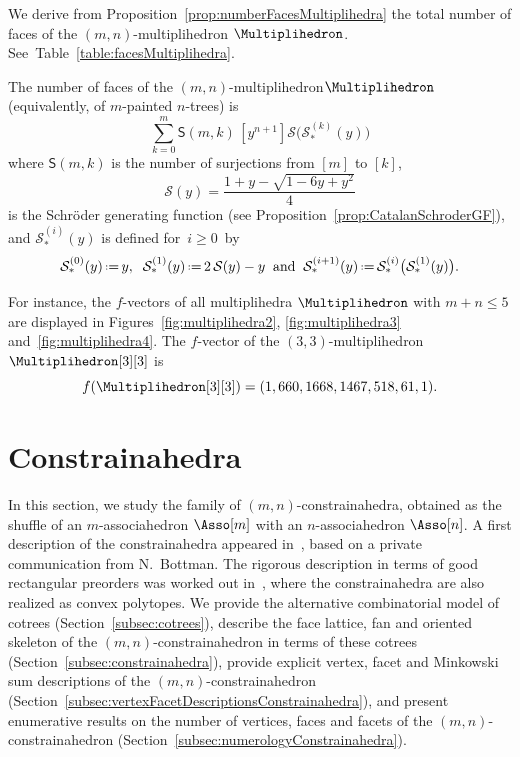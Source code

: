 \documentclass[AHL,Unicode,longabstracts,published]{cedram}
\newcommand{\eqdef}{\mbox{\,\raisebox{0.2ex}{\scriptsize\ensuremath{\mathrm:}}\ensuremath{=}\,}}
\newcommand{\surjections}[2]{\mathsf{S}(#1,#2)}
\newcommand{\SGF}{\mathcal{S}}
\newcommand{\tSGF}{\mathcal{S}_\ast}
\begin{document}
We derive from Proposition~\ref{prop:numberFacesMultiplihedra} the total number of faces of the $(m,n)$-multipli\-hedron $\Multiplihedron$. See~Table~\ref{table:facesMultiplihedra}.

\begin{prop}\label{prop:numberFacesMultiplihedra2}
The number of faces of the $(m,n)$-multiplihedron\linebreak ${\Multiplihedron}$ (equivalently, of $m$-painted $n$-trees) is
\[
\sum_{k = 0}^m \surjections{m}{k} \, \left[y^{n+1}\right] \SGF \big(\tSGF^{(k)}(y) \big)
\]
where $\surjections{m}{k}$ is the number of surjections from $[m]$ to $[k]$,
\[
\SGF(y) = \frac{1+y-\sqrt{1-6y+y^2}}{4}
\]
is the Schr\"oder generating function (see Proposition~\ref{prop:CatalanSchroderGF}), and $\tSGF^{(i)}(y)$ is defined for~$i \ge 0$~by
\[
\tSGF^{(0)}(y) \eqdef y,
\;\;
\tSGF^{(1)}(y) \eqdef 2 \, \SGF(y) - y
\;\;\text{and}\;\;
\tSGF^{(i+1)}(y) \eqdef \tSGF^{(i)} \big(\tSGF^{(1)}(y) \big).
\]
\end{prop}

For instance, the $f$-vectors of all multiplihedra $\Multiplihedron$ with $m + n \le 5$ are displayed in Figures~\ref{fig:multiplihedra2}, \ref{fig:multiplihedra3} and~\ref{fig:multiplihedra4}. The $f$-vector of the $(3,3)$-multiplihedron~$\Multiplihedron[3][3]$ is
\[
f(\Multiplihedron[3][3]) = (1, 660, 1668, 1467, 518, 61, 1).
\]



\section{Constrainahedra}\label{sec:constrainahedra}

In this section, we study the family of $(m,n)$-constrainahedra, obtained as the shuffle of an $m$-associahedron $\Asso[m]$ with an $n$-associahedron $\Asso[n]$. A first description of the constrainahedra appeared in~\cite{Tierney}, based on a private communication from N.~Bottman. The rigorous description in terms of good rectangular preorders was worked out in~\cite{BottmanPoliakova,Poliakova}, where the constrainahedra are also realized as convex polytopes. We provide the alternative combinatorial model of cotrees (Section~\ref{subsec:cotrees}), describe the face lattice, fan and oriented skeleton of the $(m,n)$-constrainahedron in terms of these cotrees (Section~\ref{subsec:constrainahedra}), provide explicit vertex, facet and Minkowski sum descriptions of the $(m,n)$-constrainahedron (Section~\ref{subsec:vertexFacetDescriptionsConstrainahedra}), and present enumerative results on the number of vertices, faces and facets of the $(m,n)$-constrainahedron (Section~\ref{subsec:numerologyConstrainahedra}).
\end{document}
